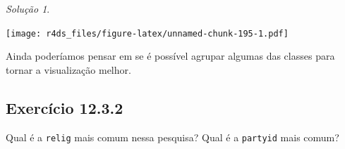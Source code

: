 \documentclass[
]{latex/krantz}
\newenvironment{Shaded}{\begin{snugshade}}{\end{snugshade}}
\newcommand{\AttributeTok}[1]{\textcolor[rgb]{0.13,0.29,0.53}{#1}}
\newcommand{\FunctionTok}[1]{\textcolor[rgb]{0.13,0.29,0.53}{\textbf{#1}}}
\newcommand{\NormalTok}[1]{#1}
\newcommand{\OtherTok}[1]{\textcolor[rgb]{0.56,0.35,0.01}{#1}}
\newcommand{\SpecialCharTok}[1]{\textcolor[rgb]{0.81,0.36,0.00}{\textbf{#1}}}
\newcommand{\StringTok}[1]{\textcolor[rgb]{0.31,0.60,0.02}{#1}}
\theoremstyle{definition}
\theoremstyle{definition}
\theoremstyle{definition}
\theoremstyle{definition}
\theoremstyle{remark}
\newtheorem*{solution}{Solução}
\begin{document}
\begin{solution}
\begin{Shaded}
\end{Shaded}

\texttt{[image: r4ds\_files/figure-latex/unnamed-chunk-195-1.pdf]}

Ainda poderíamos pensar em se é possível agrupar algumas das classes para tornar a visualização melhor.

\end{solution}

\hypertarget{exr12-3-2}{%
\subsection*{Exercício 12.3.2}\label{exr12-3-2}}

Qual é a \texttt{relig} mais comum nessa pesquisa? Qual é a \texttt{partyid} mais comum?
\end{document}
